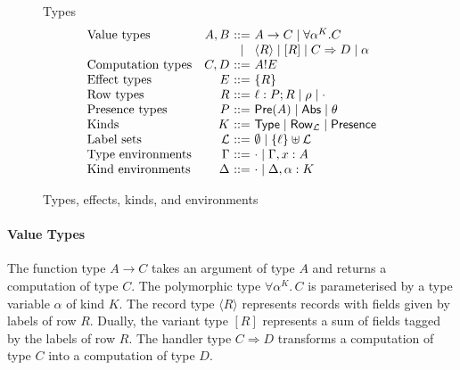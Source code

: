 \documentclass[12pt,mscres,cdtppar,twoside,openright,logo,rightchapter,normalheadings]{infthesis}
\makeatletter
\theoremstyle{definition}
\newcommand{\slab}[1]{\textrm{#1}}
\newcommand{\Record}[1]{\ensuremath{\langle #1 \rangle}}
\newcommand{\Pre}[1]{\mathsf{Pre}(#1)}
\newcommand{\Abs}{\mathsf{Abs}}
\newcommand{\Presence}{\mathsf{Presence}}
\newcommand{\Row}{\mathsf{Row}}
\newcommand{\Type}{\mathsf{Type}}
\newcommand{\Int}{\mathsf{Int}}
\newcommand{\Bool}{\mathsf{Bool}}
\newcommand{\eff}{!}
\newcommand{\Harrow}[4]{#1!#2 \Rightarrow #3!#4}
\newcommand{\ba}{\begin{array}}
\newcommand{\ea}{\end{array}}
\newenvironment{syntax}{\[\ba{@{}l@{\quad}r@{~}c@{~}l@{}}}{\ea\]\ignorespacesafterend}
\makeatother
\begin{document}
\begin{figure}
Types
\begin{syntax}
\slab{Value types}    &A,B  &::= & %
                                      A \to C
                               \mid  \forall \alpha^K.C \\
                             &&\mid& \Record{R} \mid [R]
                               \mid  C \Rightarrow D \mid \alpha \\
\slab{Computation types} 
                      &C,D  &::= & A \eff E \\
\slab{Effect types}   &E    &::= & \{R\}\\
\slab{Row types}      &R    &::= & \ell : P;R \mid \rho \mid \cdot \\
\slab{Presence types} &P    &::= & \Pre{A} \mid \Abs \mid \theta\\
\slab{Kinds}          &K    &::= & \Type \mid \Row_\mathcal{L} \mid \Presence\\
\slab{Label sets}     &\mathcal{L} &::=& \emptyset \mid \{\ell\} \uplus \mathcal{L}\\
\slab{Type environments} &\Gamma &::=& \cdot \mid \Gamma, x:A \\
\slab{Kind environments} &\Delta &::=& \cdot \mid \Delta, \alpha:K \\
\end{syntax}
\caption{Types, effects, kinds, and environments}
\label{fig:types-syntax}
\end{figure}

\paragraph{Value Types}
The function type $A \to C$ takes an argument of type $A$ and returns
a computation of type $C$.
The polymorphic type $\forall \alpha^K .\, C$ is parameterised by a
type variable $\alpha$ of kind $K$. The record type $\Record{R}$
represents records with fields given by labels of row $R$. Dually, the
variant type $[R]$ represents a sum of fields tagged by the labels of
row $R$. The handler type $C \Rightarrow D$ transforms a computation
of type $C$ into a computation of type $D$.
\end{document}
